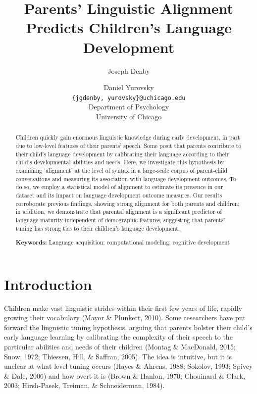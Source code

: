 \documentclass[10pt, letterpaper]{article}
\title{Parents' Linguistic Alignment Predicts Children's Language Development}
\author{Joseph Denby \and Daniel Yurovsky \\
        \texttt{\{jgdenby, yurovsky\}@uchicago.edu} \\
       Department of Psychology \\ University of Chicago}
\begin{document}
\maketitle

\begin{abstract}
Children quickly gain enormous linguistic knowledge during early
development, in part due to low-level features of their parents' speech.
Some posit that parents contribute to their child's language development
by calibrating their language according to their child's developmental
abilities and needs. Here, we investigate this hypothesis by examining
`alignment' at the level of syntax in a large-scale corpus of
parent-child conversations and measuring its association with language
development outcomes. To do so, we employ a statistical model of
alignment to estimate its presence in our dataset and its impact on
language development outcome measures. Our results corroborate previous
findings, showing strong alignment for both parents and children; in
addition, we demonstrate that parental alignment is a significant
predictor of language maturity independent of demographic features,
suggesting that parents' tuning has strong ties to their children's
language development.

\textbf{Keywords:}
Language acquisition; computational modeling; cognitive development
\end{abstract}

\hypertarget{introduction}{%
\section{Introduction}\label{introduction}}

Children make vast linguistic strides within their first few years of
life, rapidly growing their vocabulary (Mayor \& Plunkett, 2010). Some
researchers have put forward the linguistic tuning hypothesis, arguing
that parents bolster their child's early language learning by
calibrating the complexity of their speech to the particular abilities
and needs of their children (Montag \& MacDonald, 2015; Snow, 1972;
Thiessen, Hill, \& Saffran, 2005). The idea is intuitive, but it is
unclear at what level tuning occurs (Hayes \& Ahrens, 1988; Sokolov,
1993; Spivey \& Dale, 2006) and how overt it is (Brown \& Hanlon, 1970;
Chouinard \& Clark, 2003; Hirsh-Pasek, Treiman, \& Schneiderman, 1984).
\end{document}
